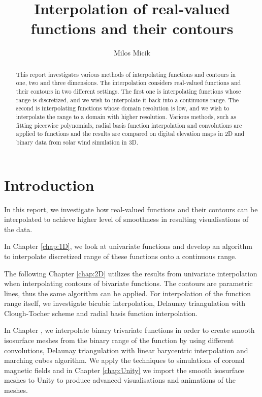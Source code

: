 \documentclass[a4paper,10pt]{report}
\title{Interpolation of real-valued functions and their contours}
\author{Milos Micik}
\begin{document}
\maketitle

\begin{abstract}
This report investigates various methods of interpolating functions and contours in one, two and three dimensions. The interpolation considers real-valued functions and their contours in two different settings. The first one is interpolating functions whose range is discretized, and we wish to interpolate it back into a continuous range. The second is interpolating functions whose domain resolution is low, and we wish to interpolate the range to a domain with higher resolution. Various methods, such as fitting piecewise polynomials, radial basis function interpolation and convolutions are applied to functions and the results are compared on digital elevation maps in 2D and binary data from solar wind simulation in 3D.
\end{abstract}

\newpage
\tableofcontents
\newpage

\chapter{Introduction}
In this report, we investigate how real-valued functions and their contours can be interpolated to achieve higher level of smoothness in resulting visualisations of the data.

In Chapter \ref{chap:1D}, we look at univariate functions and develop an algorithm to interpolate discretized range of these functions onto a continuous range.

The following Chapter \ref{chap:2D} utilizes the results from univariate interpolation when interpolating contours of bivariate functions. The contours are parametric lines, thus the same algorithm can be applied. For interpolation of the function range itself, we investigate bicubic interpolation, Delaunay triangulation with Clough-Tocher scheme and radial basis function interpolation.

In Chapter \label{chap:3D}, we interpolate binary trivariate functions in order to create smooth isosurface meshes from the binary range of the function by using different convolutions, Delaunay triangulation with linear barycentric interpolation and marching cubes algorithm. We apply the techniques to simulations of coronal magnetic fields and in Chapter \ref{chap:Unity} we import the smooth isosurface meshes to Unity to produce advanced visualisations and animations of the meshes.
\end{document}

